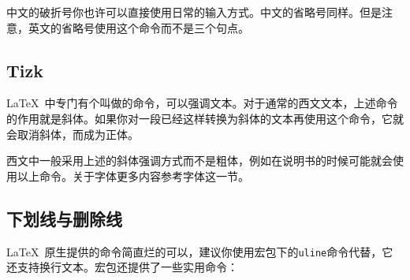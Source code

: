 中文的破折号你也许可以直接使用日常的输入方式。中文的省略号同样。但是注意，英文的省略号使用这个命令而不是三个句点。
\subsection{Tizk}
\LaTeX\ 中专门有个叫做的命令，可以强调文本。对于通常的西文文本，上述命令的作用就是斜体。如果你对一段已经这样转换为斜体的文本再使用这个命令，它就会取消斜体，而成为正体。

西文中一般采用上述的斜体强调方式而不是粗体，例如在说明书的时候可能就会使用以上命令。关于字体更多内容参考字体这一节。

\subsection{下划线与删除线}
\LaTeX\ 原生提供的命令简直烂的可以，建议你使用宏包下的\texttt{uline}命令代替，它还支持换行文本。宏包还提供了一些实用命令：
